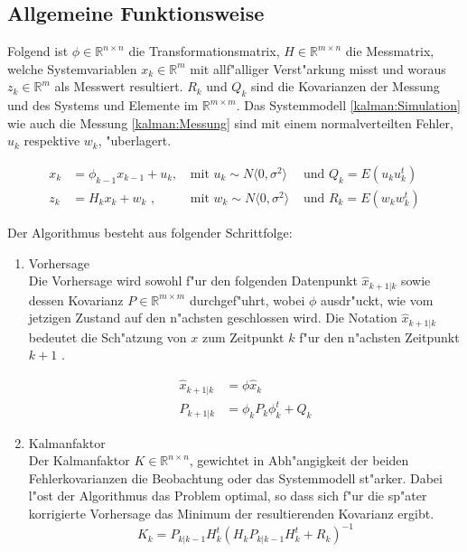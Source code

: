 \begin{refsection}
\subsection{Allgemeine Funktionsweise}

Folgend ist $\phi \in \mathbb{R}^{n\times n}$ die Transformationsmatrix, $H \in \mathbb{R}^{m\times n}$ die Messmatrix, welche Systemvariablen $x_{k}\in \mathbb{R}^{m}$ mit allf"alliger Verst"arkung misst und woraus $z_{k}\in \mathbb{R}^{m}$ als Messwert resultiert. $R_{k}$ und $Q_{k}$ sind die Kovarianzen der Messung und des Systems und Elemente im $\mathbb{R}^{m\times m}$. Das Systemmodell \eqref{kalman:Simulation} wie auch die Messung \eqref{kalman:Messung} sind mit einem normalverteilten Fehler, $u_{k}$ respektive $w_{k}$, "uberlagert\cite{skript:WRStat}.

\begin{align}
x_{k}&=\phi_{k-1}x_{k-1}+u_{k} \text{, } &\text{mit } u_{k}\sim N\langle0,\sigma^{2}\rangle &\text{ und } Q_{k}=E(u_{k}u^{t}_{k}) \label{kalman:Simulation}\\
z_{k}&=H_{k}x_{k}+w_{k} \text{ ,} &\text{mit } w_{k}\sim N\langle0,\sigma^{2}\rangle &\text{ und } R_{k}=E(w_{k}w^{t}_{k})
\label{kalman:Messung}
\end{align}


Der Algorithmus besteht aus folgender Schrittfolge:
\begin{enumerate}

\item Vorhersage\\
Die Vorhersage wird sowohl f"ur den folgenden Datenpunkt $\hat{x}_{k+1|k}$ sowie dessen Kovarianz $P \in \mathbb{R}^{m\times m}$ durchgef"uhrt, wobei $\phi$ ausdr"uckt, wie vom jetzigen Zustand auf den n"achsten geschlossen wird. Die Notation $\hat{x}_{k+1|k}$ bedeutet die Sch"atzung von $x$ zum Zeitpunkt $k$ f"ur den n"achsten Zeitpunkt $k+1$ .

\begin{align*}
\hat{x}_{k+1|k} &= \phi\hat{x}_{k}\\
P_{k+1|k} &=\phi_{k}P_{k}\phi_{k}^{t}+Q_{k}
\end{align*}

\item Kalmanfaktor\\
Der Kalmanfaktor $K \in \mathbb{R}^{n\times n}$, gewichtet in Abh"angigkeit der beiden Fehlerkovarianzen die Beobachtung oder das Systemmodell st"arker. Dabei l"ost der Algorithmus das Problem optimal, so dass sich f"ur die sp"ater korrigierte Vorhersage das Minimum der resultierenden Kovarianz ergibt.\\
\[K_{k}=P_{k|k-1}H^{t}_{k}(H_{k}P_{k|k-1}H^{t}_{k}+R_{k})^{-1}   \]


\end{enumerate}
\end{refsection}
